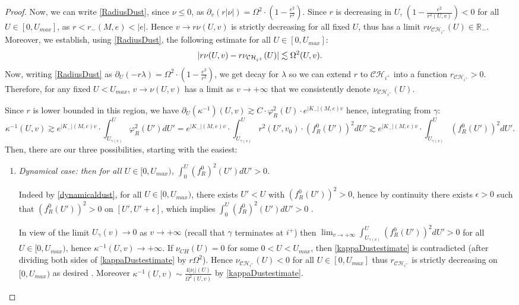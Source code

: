 \documentclass[10pt,a4paper]{article}
\theoremstyle{plain}
\theoremstyle{remark}
\theoremstyle{definition}
\newcommand{\RR}{\mathbb{R}}
\theoremstyle{plain}
\theoremstyle{remark}
\theoremstyle{definition}
\newcommand{\CH}{\mathcal{CH}_{i^+}}
\numberwithin{equation}{section}
\begin{document}
\begin{proof}
	Now, we can write \eqref{RadiusDust}, since $\nu \leq 0$, as  $\partial_v( r|\nu|) =\Omega^2 \cdot (1- \frac{e^2}{r^2})$. Since $r$ is decreasing in $U$, $(1- \frac{e^2}{r^2(U,v)})<0$ for all  $U \in [0,U_{max}]$, as $r<r_-(M,e)<|e|$. Hence $v \rightarrow r\nu(U,v)$ is strictly decreasing for all fixed $U$, thus has a limit $r\nu_{\CH}(U) \in \RR_-$. Moreover, we establish, using \eqref{RadiusDust}, the following estimate for all  $U \in [0,U_{max}]$: \begin{equation} \label{kappaDustestimate}
	| r\nu(U,v) - r\nu_{\CH}(U) |\color{black} \lesssim \Omega^2(U,v) .
	\end{equation} Now, writing \eqref{RadiusDust} as $\partial_U(- r\lambda) =\Omega^2 \cdot (1- \frac{e^2}{r^2})$, we get decay for $\lambda$ so we can extend $r$ to $\CH$ into a function $r_{\CH} >0$. Therefore, for any fixed $U<U_{max}$, $v \rightarrow \nu(U,v)$ has a limit as $v\rightarrow +\infty$ that we consistently denote $\nu_{\CH}(U)$.  \color{black}
	
Since $r$ is lower bounded in this region, we have $\partial_U (\kappa^{-1})(U,v) \gtrsim C \cdot \varphi_R^2(U) \cdot e^{|K_-|(M,e) v}$ hence, integrating from $\gamma$: \begin{equation} \label{kappamaxdust}
	\kappa^{-1}(U,v)  \gtrsim  e^{|K_-|(M,e)  v}  \cdot \int_{U_{\gamma(v)}}^U \varphi_R^2(U')dU'=  e^{|K_-|(M,e)  v}  \cdot \int_{U_{\gamma(v)}}^U r^2(U',v_0) \cdot (f_R^0(U'))^2dU' \gtrsim e^{|K_-|(M,e)  v}  \cdot \int_{U_{\gamma(v)}}^U  (f_R^0(U'))^2dU'.
	\end{equation}
	Then, there are our three possibilities, starting with the easiest: \begin{enumerate}
		\item \textit{Dynamical case: then for all $U\in [0,U_{max})$, $\int_{0}^U(f^0_R)^2(U')dU' > 0$.} 
		
	Indeed by \eqref{dynamicaldust}, for all $U\in [0,U_{max})$, there exists $U'<U$ with $(f^0_R(U'))^2 > 0$, hence by continuity there exists $\epsilon>0$ such that  $(f^0_R(U'))^2 > 0$ on $[U',U'+\epsilon]$, which implies $\int_{0}^U(f^0_R)^2(U')dU' > 0$ .
		
		
		 In view of the limit $U_{\gamma}(v) \rightarrow 0$ as $v\rightarrow +\infty$ (recall that $\gamma$ terminates at $i^+$) \color{black} then $\lim_{v \rightarrow +\infty} \int_{U_{\gamma(v)}}^U  (f_R^0(U'))^2dU' >0$ for all $U\in [0,U_{max})$, hence $\kappa^{-1}(U,v) \rightarrow +\infty$. If $ \nu_{CH}(U)=0$ for some $0<U < U_{max}$, then \eqref{kappaDustestimate} is contradicted (after dividing both sides of \eqref{kappaDustestimate} by $r \Omega^2$)\color{black}. Hence $\nu_{\CH}(U)<0$ for all $U\in [0,U_{max}]$  thus $r_{\CH}$ is strictly decreasing on $[0,U_{max})$ as desired \color{black}. Moreover $ \kappa^{-1}(U,v) \sim \frac{4|\nu_l|(U)}{\Omega^2(U,v)}$ by \eqref{kappaDustestimate}.\color{black}
		

\end{enumerate}
\end{proof}
\end{document}
